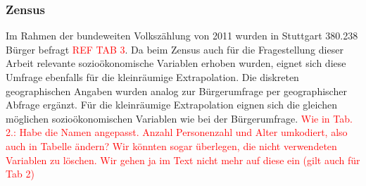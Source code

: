\documentclass{Vorlage}
\begin{document}
\begin{table}[h]
\centering
\caption{Erhobene sozioökonomische und geographische Variablen der Bürgerumfrage und deren Anzahl der Ausprägungen.}
\end{table}

\subsubsection{Zensus}
Im Rahmen der bundeweiten Volkszählung von 2011 wurden in Stuttgart 380.238 Bürger befragt \textcolor{red}{REF TAB 3}. Da beim Zensus auch für die Fragestellung dieser Arbeit relevante sozioökonomische Variablen erhoben wurden, eignet sich diese Umfrage ebenfalls für die kleinräumige Extrapolation. Die diskreten geographischen Angaben wurden analog zur Bürgerumfrage per geographischer Abfrage ergänzt. Für die kleinräumige Extrapolation eignen sich die gleichen möglichen sozioökonomischen Variablen wie bei der Bürgerumfrage. 
\textcolor{red}{Wie in Tab. 2.: Habe die Namen angepasst. Anzahl Personenzahl und Alter umkodiert, also auch in Tabelle ändern? Wir könnten sogar überlegen, die nicht verwendeten Variablen zu löschen. Wir gehen ja im Text nicht mehr auf diese ein (gilt auch für Tab 2)}
\end{document}
